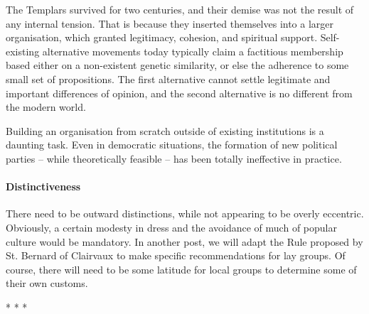 The Templars survived for two centuries, and their demise was not the result of any internal tension. That is because they inserted themselves into a larger organisation, which granted legitimacy, cohesion, and spiritual support. Self-existing alternative movements today typically claim a factitious membership based either on a non-existent genetic similarity, or else the adherence to some small set of propositions. The first alternative cannot settle legitimate and important differences of opinion, and the second alternative is no different from the modern world.

Building an organisation from scratch outside of existing institutions is a daunting task. Even in democratic situations, the formation of new political parties – while theoretically feasible – has been totally ineffective in practice.

\paragraph{Distinctiveness}
There need to be outward distinctions, while not appearing to be overly eccentric. Obviously, a certain modesty in dress and the avoidance of much of popular culture would be mandatory. In another post, we will adapt the Rule proposed by St. Bernard of Clairvaux to make specific recommendations for lay groups. Of course, there will need to be some latitude for local groups to determine some of their own customs.




\begin{center}* * *\end{center}

